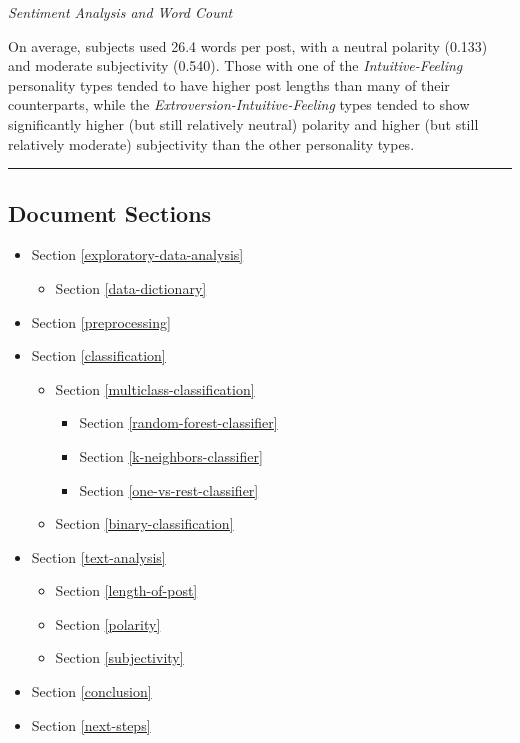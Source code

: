 \documentclass[11pt]{article}
\providecommand{\tightlist}{%
      \setlength{\itemsep}{0pt}\setlength{\parskip}{0pt}}
\begin{document}
\emph{Sentiment Analysis and Word Count}

On average, subjects used 26.4 words per post, with a neutral polarity
(0.133) and moderate subjectivity (0.540). Those with one of the
\emph{Intuitive-Feeling} personality types tended to have higher post
lengths than many of their counterparts, while the
\emph{Extroversion-Intuitive-Feeling} types tended to show significantly
higher (but still relatively neutral) polarity and higher (but still
relatively moderate) subjectivity than the other personality types.

    \begin{center}\rule{0.5\linewidth}{\linethickness}\end{center}

    \subsection{Document Sections}\label{document-sections}

\begin{itemize}
\tightlist
\item
  Section \ref{exploratory-data-analysis}

  \begin{itemize}
  \tightlist
  \item
    Section \ref{data-dictionary}
  \end{itemize}
\item
  Section \ref{preprocessing}
\item
  Section \ref{classification}

  \begin{itemize}
  \tightlist
  \item
    Section \ref{multiclass-classification}

    \begin{itemize}
    \tightlist
    \item
      Section \ref{random-forest-classifier}
    \item
      Section \ref{k-neighbors-classifier}
    \item
      Section \ref{one-vs-rest-classifier}
    \end{itemize}
  \item
    Section \ref{binary-classification}
  \end{itemize}
\item
  Section \ref{text-analysis}

  \begin{itemize}
  \tightlist
  \item
    Section \ref{length-of-post}
  \item
    Section \ref{polarity}
  \item
    Section \ref{subjectivity}
  \end{itemize}
\item
  Section \ref{conclusion}
\item
  Section \ref{next-steps}
\end{itemize}
\end{document}
